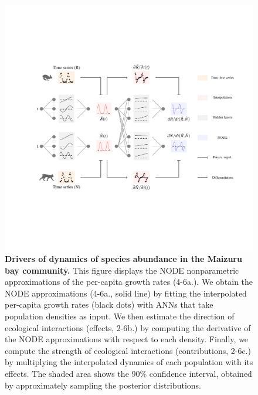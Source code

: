 \documentclass[11pt, oneside]{article}
\begin{document}
\begin{figure}[H]
\includegraphics[width=1\linewidth,page=36]{figures/main.pdf}
\caption{
    \textbf{Drivers of dynamics of species abundance in the Maizuru bay community.}
    This figure displays the NODE nonparametric approximations of the per-capita growth rates (4-6a.). 
    We obtain the NODE approximations (4-6a., solid line) by fitting the interpolated per-capita growth rates (black dots) with ANNs that take population densities as input. 
    We then estimate the direction of ecological interactions (effects, 2-6b.) by computing the derivative of the NODE approximations with respect to each density. 
    Finally, we compute the strength of ecological interactions (contributions, 2-6c.) by multiplying the interpolated dynamics of each population with its effects. 
    The shaded area shows the 90\% confidence interval, obtained by approximately sampling the posterior distributions.
}
\end{figure}
\newpage
\end{document}
